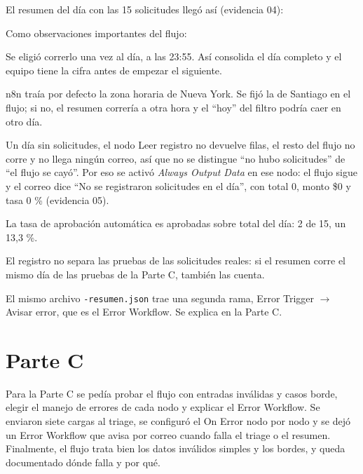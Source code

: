 \documentclass{article}
\begin{document}
El resumen del día con las 15 solicitudes llegó así (evidencia 04):

\begin{center}
\end{center}

Como observaciones importantes del flujo:
\begin{compactitem}
\item Se eligió correrlo una vez al día, a las 23:55. Así consolida el día completo y el
equipo tiene la cifra antes de empezar el siguiente.
\item n8n traía por defecto la zona horaria de Nueva York. Se fijó la de Santiago en el flujo;
si no, el resumen correría a otra hora y el ``hoy'' del filtro podría caer en otro día.
\item Un día sin solicitudes, el nodo \textsf{Leer registro} no devuelve filas, el resto del
flujo no corre y no llega ningún correo, así que no se distingue ``no hubo solicitudes'' de
``el flujo se cayó''. Por eso se activó \emph{Always Output Data} en ese nodo: el flujo sigue
y el correo dice ``No se registraron solicitudes en el día'', con total 0, monto \$0 y tasa
0 \% (evidencia 05).
\item La tasa de aprobación automática es aprobadas sobre total del día: 2 de 15, un 13,3 \%.
\item El registro no separa las pruebas de las solicitudes reales: si el resumen corre el mismo
día de las pruebas de la Parte C, también las cuenta.
\item El mismo archivo \texttt{-resumen.json} trae una segunda rama, Error Trigger
$\rightarrow$ Avisar error, que es el Error Workflow. Se explica en la Parte C.
\end{compactitem}

\section*{Parte C}
Para la Parte C se pedía probar el flujo con entradas inválidas y casos borde, elegir el manejo
de errores de cada nodo y explicar el Error Workflow. Se enviaron siete cargas al triage, se
configuró el On Error nodo por nodo y se dejó un Error Workflow que avisa por correo cuando
falla el triage o el resumen. Finalmente, el flujo trata bien los datos inválidos simples y
los bordes, y queda documentado dónde falla y por qué.
\end{document}
